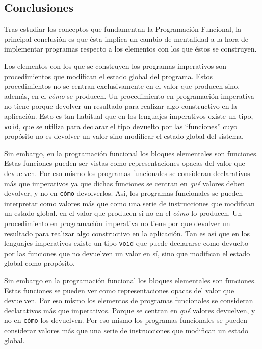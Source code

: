 \documentclass[../main.tex]{subfiles}
\begin{document}
\subsection{Conclusiones}
Tras estudiar los conceptos que fundamentan la Programación Funcional, la principal
conclusión es que ésta implica un cambio de mentalidad a la hora de implementar programas
respecto a los elementos con los que éstos se construyen.

Los elementos con los que se construyen los programas imperativos son procedimientos
que modifican el estado global del programa. Estos procedimientos no se centran exclusivamente
en el valor que producen sino, además, en el \textit{cómo} se producen. Un procedimiento en programación
imperativa no tiene porque devolver un resultado para realizar algo constructivo en la aplicación.
Esto es tan habitual que en los lenguajes imperativos existe un tipo, \texttt{void}, que se utiliza
para declarar el tipo devuelto por las ``funciones'' cuyo propósito no es devolver un valor sino  
modificar el estado global del sistema.

Sin embargo, en la programación funcional los bloques elementales son funciones. Estas
funciones pueden ser vistas como representaciones opacas del valor que devuelven. Por eso
mismo los programas funcionales se consideran declarativos más que imperativos ya que
dichas funciones se centran en \textit{qué} valores deben devolver, y no en \texttt{cómo} 
devolverlos. Así, los programas funcionales se pueden interpretar como valores más que como 
una serie de instrucciones que modifican un estado global.
en el valor que producen si no en el \textit{cómo} lo producen. Un procedimiento en programación
imperativa no tiene por que devolver un resultado para realizar algo constructivo en la aplicación.
Tan es así que en los lenguajes imperativos existe un tipo \texttt{void} que puede declararse
como devuelto por las funciones que no devuelven un valor en sí, sino que modifican el estado global
como propósito.

Sin embargo en la programación funcional los bloques elementales son funciones. Estas
funciones se pueden ver como representaciones opacas del valor que devuelven. Por eso
mismo los elementos de programas funcionales se consideran declarativos más que imperativos.
Porque se centran en \textit{qué} valores devuelven, y no en \texttt{cómo} los devuelven.
Por eso mismo los programas funcionales se pueden considerar valores más que una serie de
instrucciones que modifican un estado global.
\end{document}
